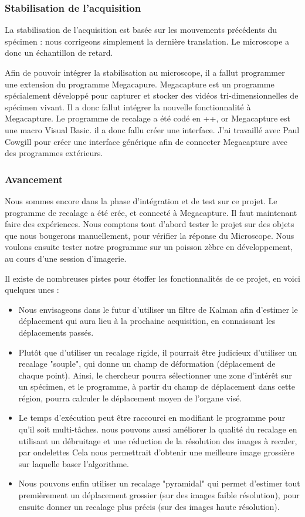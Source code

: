 \subsubsection{Stabilisation de l'acquisition}

La stabilisation de l'acquisition est basée sur les mouvements précédents du spécimen :
nous corrigeons simplement la dernière translation. Le microscope a donc un échantillon de retard.

Afin de pouvoir intégrer la stabilisation au microscope, il a fallut programmer une extension du programme Megacapure.
Megacapture est un programme spécialement développé pour capturer et stocker
des vidéos tri-dimensionnelles de spécimen vivant.
Il a donc fallut intégrer la nouvelle fonctionnalité à Megacapture. Le programme de recalage a été codé en {\C++},
or Megacapture est une macro Visual Basic. il a donc fallu créer une interface.
J'ai travaillé avec Paul Cowgill pour créer une interface générique afin de connecter
Megacapture avec des programmes extérieurs.

\subsubsection{Avancement}

Nous sommes encore dans la phase d'intégration et de test sur ce projet.
Le programme de recalage a été crée, et connecté à Megacapture.
Il faut maintenant faire des expériences. Nous comptons tout d'abord tester le projet
sur des objets que nous bougerons manuellement, pour vérifier la réponse du Microscope.
Nous voulons ensuite tester notre programme sur un poisson zèbre en développement, au cours d'une session d'imagerie.

Il existe de nombreuses pistes pour étoffer les fonctionnalités de ce projet, en voici quelques unes :
\begin{itemize}
  \item Nous envisageons dans le futur d'utiliser un filtre de Kalman afin d'estimer
  le déplacement qui aura lieu à la prochaine acquisition, en connaissant les déplacements passés.
  \item Plutôt que d'utiliser un recalage rigide, il pourrait être judicieux d'utiliser un recalage "souple",
  qui donne un champ de déformation (déplacement de chaque point).
  Ainsi, le chercheur pourra sélectionner une zone d'intérêt sur un spécimen,
  et le programme, à partir du champ de déplacement dans cette région, pourra calculer
  le déplacement moyen de l'organe visé.
  \item Le temps d'exécution peut être raccourci en modifiant le programme pour qu'il soit multi-tâches.
  nous pouvons aussi améliorer la qualité du recalage en utilisant un débruitage et une réduction de la résolution
  des images à recaler, par ondelettes
  Cela nous permettrait d'obtenir une meilleure image grossière sur laquelle baser l'algorithme.
  \item Nous pouvons enfin utiliser un recalage "pyramidal" qui permet d'estimer tout premièrement un déplacement
  grossier (sur des images faible résolution), pour ensuite donner un recalage plus précis (sur des images haute résolution).
\end{itemize}


